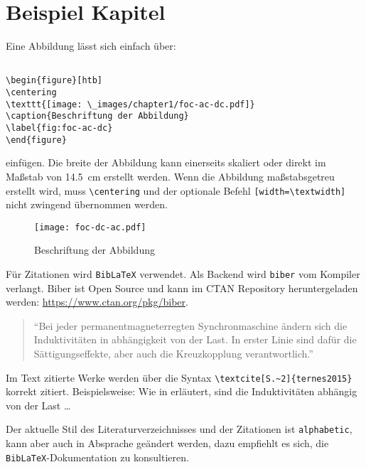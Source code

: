 
\chapter{Beispiel Kapitel}
\label{chap:beispiel-kapitel}

Eine Abbildung lässt sich einfach über:

\lstset{language=TeX}
\begin{lstlisting}

\begin{figure}[htb]
\centering
\texttt{[image: \_images/chapter1/foc-ac-dc.pdf]}
\caption{Beschriftung der Abbildung}
\label{fig:foc-ac-dc}
\end{figure}

\end{lstlisting}

einfügen.
Die breite der Abbildung kann einerseits skaliert oder direkt im Maßstab von \SI{14.5}{\centi\meter} erstellt werden.
Wenn die Abbildung maßstabsgetreu erstellt wird, muss \verb|\centering| und der optionale Befehl \verb|[width=\textwidth]| nicht zwingend übernommen werden.

\begin{figure}[htb]
	\centering
	\texttt{[image: foc-dc-ac.pdf]}
	\caption{Beschriftung der Abbildung}
	\label{fig:foc-dc-ac}
\end{figure}

Für Zitationen wird \verb|BibLaTeX| verwendet. Als Backend wird \verb|biber| vom Kompiler verlangt.
Biber ist Open Source und kann im CTAN Repository heruntergeladen werden: \url{https://www.ctan.org/pkg/biber}.

\begin{quote}
\enquote{Bei jeder permanentmagneterregten Synchronmaschine ändern sich die Induktivitäten in abhängigkeit von der Last. In erster Linie sind dafür die Sättigungseffekte, aber auch die Kreuzkopplung verantwortlich.} \autocite[S.~2]{ternes2015}
\end{quote}

Im Text zitierte Werke werden über die Syntax \verb|\textcite[S.~2]{ternes2015}| korrekt zitiert. Beispielsweise: Wie in \textcite[S.~2]{ternes2015} erläutert, sind die Induktivitäten abhängig von der Last \ldots

Der aktuelle Stil des Literaturverzeichnisses und der Zitationen ist \verb|alphabetic|, kann aber auch in Absprache geändert werden, dazu empfiehlt es sich, die \verb|BibLaTeX|-Dokumentation zu konsultieren.

